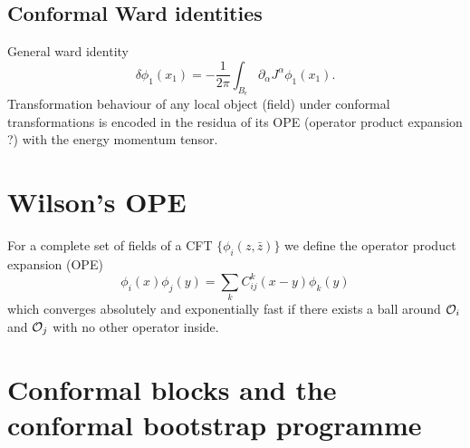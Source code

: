  	
 	
 	 	
 	\subsection{Conformal Ward identities}
 	\begin{mybox}{}
 		General ward identity
 		\begin{equation}
 		\delta \phi_1 (x_1) = - \frac{1}{2 \pi} \int_{B_\epsilon} \partial_\alpha J^\alpha \phi_1(x_1).
 		\end{equation}
 		Transformation behaviour of any local object (field) under conformal transformations is encoded in the residua of its OPE (operator product expansion ?) with the energy momentum tensor.
 	\end{mybox}
 	
 	
 	
 	
 	
 	
 	

 	
 	
 	
 	\section{Wilson's OPE}
 	\begin{mybox}{}
 		For a complete set of fields of a CFT $\{\phi_i(z,\bar{z})\}$ we define the operator product expansion (OPE) 
 		\begin{equation}
 		\phi_i(x) \phi_j(y) = \sum_k C^k_{ij}(x-y) \phi_k(y)
 		\end{equation}
 		which converges absolutely and exponentially fast if there exists a ball around $\mathcal{O}_i$ and $\mathcal{O}_j$ with no other operator inside.
 	\end{mybox}
 	\section{Conformal blocks and the conformal bootstrap programme}
